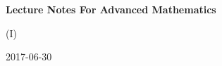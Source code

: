 \begin{center}
	\bigskip
	
	
	\bigskip
	
	{\large\bf Lecture Notes For Advanced Mathematics
	
	(I)}
	
	2017-06-30
\end{center}